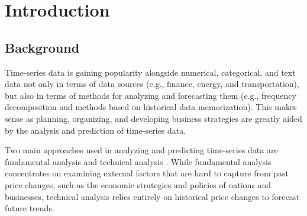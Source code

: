 
\chapter{Introduction}
\label{chap:intro}

\section{Background}


Time-series data is gaining popularity alongside numerical, categorical, and text data not only in terms of data sources (e.g., finance, energy, and transportation), but also in terms of methods for analyzing and forecasting them (e.g., frequency decomposition and methods based on historical data memorization). This makes sense as planning, organizing, and developing business strategies are greatly aided by the analysis and prediction of time-series data.


Two main approaches used in analyzing and predicting time-series data are fundamental analysis and technical analysis \cite{ayitey2023forex}. While fundamental analysis concentrates on examining external factors that are hard to capture from past price changes, such as the economic strategies and policies of nations and businesses, technical analysis relies entirely on historical price changes to forecast future trends.

